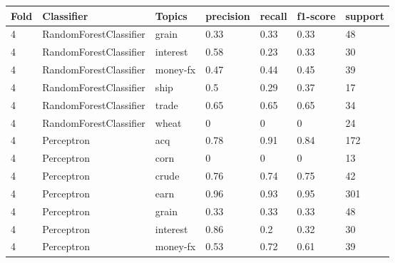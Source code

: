 \documentclass{article}
\begin{document}
\begin{table}[h]
\begin{tabular}{lllllll}
\textbf{Fold} & \textbf{Classifier}    & \textbf{Topics} & \textbf{precision} & \textbf{recall} & \textbf{f1-score} & \textbf{support} \\ \hline
4             & RandomForestClassifier & grain           & 0.33               & 0.33            & 0.33              & 48               \\
4             & RandomForestClassifier & interest        & 0.58               & 0.23            & 0.33              & 30               \\
4             & RandomForestClassifier & money-fx        & 0.47               & 0.44            & 0.45              & 39               \\
4             & RandomForestClassifier & ship            & 0.5                & 0.29            & 0.37              & 17               \\
4             & RandomForestClassifier & trade           & 0.65               & 0.65            & 0.65              & 34               \\
4             & RandomForestClassifier & wheat           & 0                  & 0               & 0                 & 24               \\
4             & Perceptron             & acq             & 0.78               & 0.91            & 0.84              & 172              \\
4             & Perceptron             & corn            & 0                  & 0               & 0                 & 13               \\
4             & Perceptron             & crude           & 0.76               & 0.74            & 0.75              & 42               \\
4             & Perceptron             & earn            & 0.96               & 0.93            & 0.95              & 301              \\
4             & Perceptron             & grain           & 0.33               & 0.33            & 0.33              & 48               \\
4             & Perceptron             & interest        & 0.86               & 0.2             & 0.32              & 30               \\
4             & Perceptron             & money-fx        & 0.53               & 0.72            & 0.61              & 39               \\

\end{tabular}
\end{table}
\end{document}
